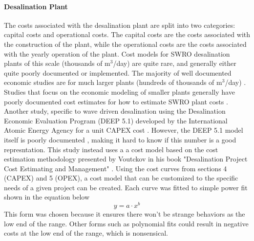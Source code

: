 \documentclass{article}
\begin{document}
\begin{multicols}{2}
\paragraph{Desalination Plant}
The costs associated with the desalination plant are split into two categories: capital costs and operational costs. The capital costs are the costs associated with the construction of the plant, while the operational costs are the costs associated with the yearly operation of the plant. Cost models for SWRO desalination plants of this scale (thousands of m$^3$/day) are quite rare, and generally either quite poorly documented or implemented. The majority of well documented economic studies are for much larger plants (hundreds of thousands of m$^3$/day) \cite{Slocum2016,Haefner2023,roopexcurve,Wittholz2008}. Studies that focus on the economic modeling of smaller plants generally have poorly documented cost estimates for how to estimate SWRO plant costs \cite{Elkadeem2024,Goekcek2016}. Another study, specific to wave driven desalination using the Desalination Economic Evaluation Program (DEEP 5.1) developed by the International Atomic Energy Agency for a unit CAPEX cost \cite{Yu2022}. However, the DEEP 5.1 model itself is poorly documented \cite{DEEP5manual}, making it hard to know if this number is a good represntation. 
This study instead uses a a cost model based on the cost estimation methodology presented by Voutckov in his book "Desalination Project Cost Estimating and Management" \cite{voutch}. Using the cost curves from sections 4 (CAPEX) and 5 (OPEX), a cost model that can be customized to the specific needs of a given project can be created. Each curve was fitted to simple power fit shown in the equation below
\begin{equation}
    y = a \cdot x^b
\end{equation}
This form was chosen because it ensures there won't be strange behaviors as the low end of the range. Other forms such as polynomial fits could result in negative costs at the low end of the range, which is nonsensical.



\end{multicols}
\end{document}
